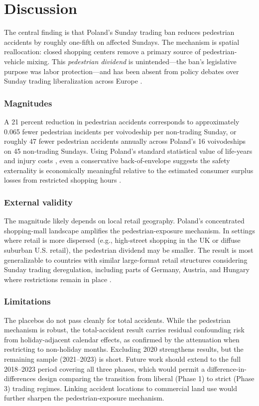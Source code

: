 \documentclass[12pt]{article}
\begin{document}



\section{Discussion}
\label{sec:discussion}

The central finding is that Poland's Sunday trading ban reduces pedestrian accidents by roughly one-fifth on affected Sundays. The mechanism is spatial reallocation: closed shopping centers remove a primary source of pedestrian-vehicle mixing. This \textit{pedestrian dividend} is unintended---the ban's legislative purpose was labor protection---and has been absent from policy debates over Sunday trading liberalization across Europe \citep{eu2019retail}.

\subsubsection*{Magnitudes} A 21 percent reduction in pedestrian accidents corresponds to approximately 0.065 fewer pedestrian incidents per voivodeship per non-trading Sunday, or roughly 47 fewer pedestrian accidents annually across Poland's 16 voivodeships on 45 non-trading Sundays. Using Poland's standard statistical value of life-years and injury costs \citep{golaszewski2019social}, even a conservative back-of-envelope suggests the safety externality is economically meaningful relative to the estimated consumer surplus losses from restricted shopping hours \citep{szulc2019consumer}.

\subsubsection*{External validity} The magnitude likely depends on local retail geography. Poland's concentrated shopping-mall landscape amplifies the pedestrian-exposure mechanism. In settings where retail is more dispersed (e.g., high-street shopping in the UK or diffuse suburban U.S. retail), the pedestrian dividend may be smaller. The result is most generalizable to countries with similar large-format retail structures considering Sunday trading deregulation, including parts of Germany, Austria, and Hungary where restrictions remain in place \citep{bossler2023sunday}.

\subsubsection*{Limitations} The placebos do not pass cleanly for total accidents. While the pedestrian mechanism is robust, the total-accident result carries residual confounding risk from holiday-adjacent calendar effects, as confirmed by the attenuation when restricting to non-holiday months. Excluding 2020 strengthens results, but the remaining sample (2021--2023) is short. Future work should extend to the full 2018--2023 period covering all three phases, which would permit a difference-in-differences design comparing the transition from liberal (Phase 1) to strict (Phase 3) trading regimes. Linking accident locations to commercial land use would further sharpen the pedestrian-exposure mechanism.
\end{document}
